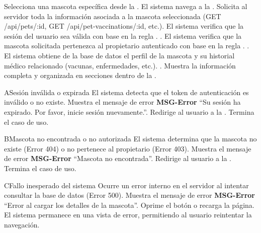   \begin{UCtrayectoria}
      \UCpaso[\UCactor] Selecciona una mascota específica desde la . \label{CU04-Start}
      \UCpaso El sistema navega a la .
      \UCpaso Solicita al servidor toda la información asociada a la mascota seleccionada (GET /api/pets/:id, GET /api/pet-vaccinations/:id, etc.).
      \UCpaso El sistema verifica que la sesión del usuario sea válida con base en la regla . .
      \UCpaso El sistema verifica que la mascota solicitada pertenezca al propietario autenticado con base en la regla . .
      \UCpaso El sistema obtiene de la base de datos el perfil de la mascota y su historial médico relacionado (vacunas, enfermedades, etc.). .
      \UCpaso Muestra la información completa y organizada en secciones dentro de la .
  \end{UCtrayectoria}
  
  
  \begin{UCtrayectoriaA}{A}{Sesión inválida o expirada}
       El sistema detecta que el token de autenticación es inválido o no existe.
      \UCpaso Muestra el mensaje de error {\bf MSG-Error} ``Su sesión ha expirado. Por favor, inicie sesión nuevamente.''.
      \UCpaso[] Redirige al usuario a la .
      \UCpaso[] Termina el caso de uso.
  \end{UCtrayectoriaA}
  
  \begin{UCtrayectoriaA}{B}{Mascota no encontrada o no autorizada}
       El sistema determina que la mascota no existe (Error 404) o no pertenece al propietario (Error 403).
      \UCpaso Muestra el mensaje de error {\bf MSG-Error} ``Mascota no encontrada''.
      \UCpaso[] Redirige al usuario a la .
      \UCpaso[] Termina el caso de uso.
  \end{UCtrayectoriaA}
  
  \begin{UCtrayectoriaA}{C}{Fallo inesperado del sistema}
      \UCpaso Ocurre un error interno en el servidor al intentar consultar la base de datos (Error 500).
      \UCpaso Muestra el mensaje de error {\bf MSG-Error} ``Error al cargar los detalles de la mascota''.
      \UCpaso[\UCactor] Oprime el botón  o recarga la página.
      \UCpaso[] El sistema permanece en una vista de error, permitiendo al usuario reintentar la navegación.
  \end{UCtrayectoriaA}
  
